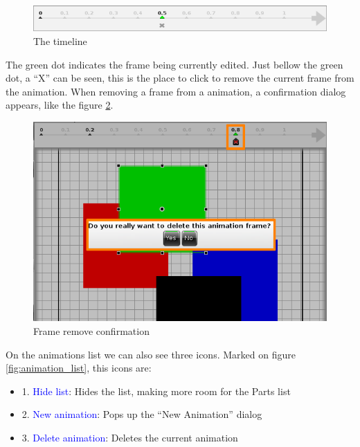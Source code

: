 \documentclass[a4paper]{profusion}
\newcommand{\GUIIcon}[1]{\textcolor{blue}{#1}}    %
\begin{document}
\begin{figure}[h!]
  \centering
  \includegraphics{images/animation_timeline.png}
  \caption{The timeline}
  \label{fig:animation_timeline}
\end{figure}

The green dot indicates the frame being currently edited. Just bellow
the green dot, a ``X'' can be seen, this is the place to click to
remove the current frame from the animation. When removing a frame
from a animation, a confirmation dialog appears, like the figure
\ref{fig:animation_remove_frame}.

\begin{figure}[h!]
  \centering
  \includegraphics[width=1.0\textwidth]{images/animation_frame_remove.png}
  \caption{Frame remove confirmation}
  \label{fig:animation_remove_frame}
\end{figure}



On the animations list we can also see three icons. Marked on figure
\ref{fig:animation_list}, this icons are:
\begin{itemize}
\item 1. \GUIIcon{Hide list}: Hides the list, making more room for the
  Parts list
\item 2. \GUIIcon{New animation}: Pops up the ``New Animation'' dialog
\item 3. \GUIIcon{Delete animation}: Deletes the current animation
\end{itemize}
\end{document}
